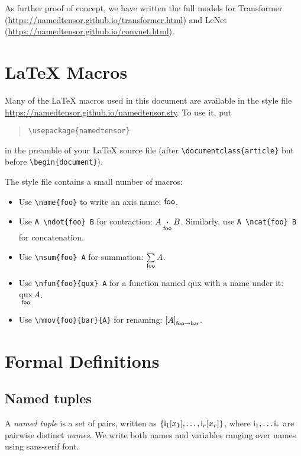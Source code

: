 \documentclass{article}
\newcommand{\tuple}[1]{\{#1\}}
\begin{document}
As further proof of concept, we have written the full models for Transformer (\url{https://namedtensor.github.io/transformer.html}) and LeNet (\url{https://namedtensor.github.io/convnet.html}).

\section{\LaTeX{} Macros}

Many of the \LaTeX{} macros used in this document are available in the style file \url{https://namedtensor.github.io/namedtensor.sty}. To use it, put
\begin{quote}
\begin{verbatim}
\usepackage{namedtensor}
\end{verbatim}
\end{quote}
in the preamble of your \LaTeX{} source file (after \verb|\documentclass{article}| but before \verb|\begin{document}|).

The style file contains a small number of macros:
\begin{itemize}
\item Use \verb|\name{foo}| to write an axis name: $\name{foo}$.
\item Use \verb|A \ndot{foo} B| for contraction: $A \ndot{foo} B$. Similarly, use \verb|A \ncat{foo} B| for concatenation.
\item Use \verb|\nsum{foo} A| for summation: $\nsum{foo} A$.
\item Use \verb|\nfun{foo}{qux} A| for a function named qux with a name under it: $\nfun{foo}{qux} A$.
\item Use \verb|\nmov{foo}{bar}{A}| for renaming: $\nmov{foo}{bar}{A}$.
\end{itemize}

\section{Formal Definitions}
\label{sec:definitions}

\newcommand{\sub}[1]{_\text{$#1$}}

\subsection{Named tuples}

A \emph{named tuple} is a set of pairs, written as $\tuple{\nidx{i\sub{1}}{x_1}, \ldots, \nidx{i\sub{r}}{x_r}}$, where $\name{i\sub{1}}, \ldots \name{i\sub{r}}$ are pairwise distinct \emph{names}. We write both names and variables ranging over names using sans-serif font.
\end{document}
